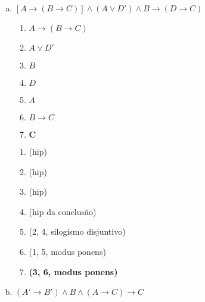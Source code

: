 \begin{Gabarito}{11}
\begin{enumerate}[a)]
\begin{multicols}{2}
        \columnbreak

        \begin{enumerate}[\ding{32}]
          \item (hip)
          \item (hip)
          \item (2, dupla negação)
          \item (3, condicional)
          \item \textbf{(1, 4, modus ponens)}
        \end{enumerate}

      \end{multicols}

      \item $[A \rightarrow (B \rightarrow C)] \wedge (A \vee D') \wedge B \rightarrow (D \rightarrow C)$ \\
      \begin{multicols}{2}

        \begin{enumerate}[1.]
          \item $A \rightarrow (B \rightarrow C)$
          \item $A \vee D'$
          \item $B$
          \item $D$
          \item $A$
          \item $B \rightarrow C$
          \item $\boldsymbol{C}$
        \end{enumerate}

        \columnbreak

        \begin{enumerate}[\ding{32}]
          \item (hip)
          \item (hip)
          \item (hip)
          \item (hip da conclusão)
          \item (2, 4, silogismo disjuntivo)
          \item (1, 5, modus ponens)
          \item \textbf{(3, 6, modus ponens)}
        \end{enumerate}

      \end{multicols}

      \item $(A' \rightarrow B') \wedge B \wedge (A \rightarrow C) \rightarrow C$ \\
      \begin{multicols}{2}


\end{multicols}
\end{enumerate}
\end{Gabarito}
